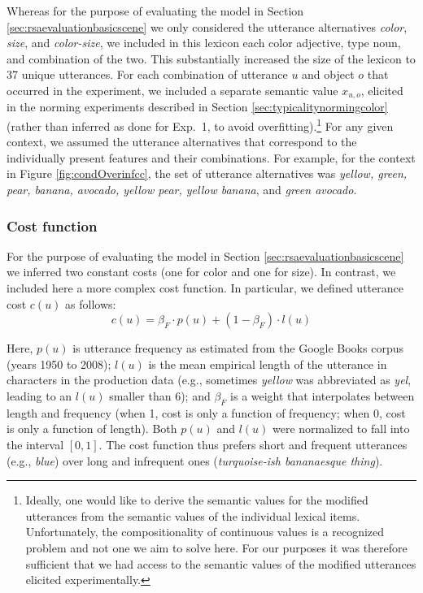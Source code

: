 \documentclass[11pt]{article}
\newcommand{\figref}[1]{Figure \ref{#1}}
\newcommand{\sectionref}[1]{Section \ref{#1}}
\begin{document}
Whereas for the purpose of evaluating the model in \sectionref{sec:rsaevaluationbasicscene}  we only considered the utterance alternatives \emph{color}, \emph{size}, and \emph{color-size}, we included in this lexicon each color adjective, type noun, and combination of the two. This substantially increased the size of the lexicon to 37 unique utterances. For each combination of utterance $u$ and object $o$ that occurred in the experiment, we included a separate semantic value $x_{u,o}$, elicited in the norming experiments described in \sectionref{sec:typicalitynormingcolor} (rather than inferred as done for Exp.~1, to avoid overfitting).\footnote{Ideally, one would like to derive the semantic values for the modified utterances from the semantic values of the individual lexical items.  Unfortunately, the compositionality of continuous values is a recognized problem \cite{kamp1995} and not one we aim to solve here. For our purposes it was therefore sufficient that we had access to the semantic values of the modified utterances elicited experimentally.} For any given context, we assumed the utterance alternatives that correspond to the individually present features and their combinations. For example, for the context in \figref{fig:condOverinfcc}, the set of utterance alternatives was \emph{yellow, green, pear, banana, avocado, yellow pear, yellow banana}, and \emph{green avocado}. 

\subsubsection{Cost function}

For the purpose of evaluating the model in \sectionref{sec:rsaevaluationbasicscene} we inferred two constant costs (one for color and one for size). In contrast, we included here a more complex cost function. In particular, we defined utterance cost $c(u)$ as follows:
\begin{equation}
c(u) = \beta_F\cdot p(u) + (1-\beta_F)\cdot l(u)
\end{equation}

Here, $p(u)$ is utterance frequency as estimated from the Google Books corpus (years 1950 to 2008); $l(u)$ is the mean empirical length of the utterance in characters in the production data (e.g., sometimes \emph{yellow} was abbreviated as \emph{yel}, leading to an $l(u)$ smaller than 6); and $\beta_F$ is a weight that interpolates between length and frequency (when 1, cost is only a function of frequency; when 0, cost is only a function of length). Both $p(u)$ and $l(u)$ were normalized to fall into the interval $[0,1]$. The cost function thus prefers short and frequent utterances (e.g., \emph{blue}) over long and infrequent ones (\emph{turquoise-ish bananaesque thing}).
\end{document}
